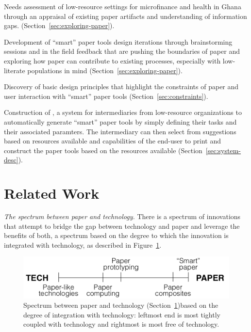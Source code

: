 \documentclass{sig-alternate}
\begin{document}
\begin{compactitem}

  \item Needs assessment of low-resource settings for microfinance and health in Ghana through an appraisal of existing paper artifacts and understanding of information gaps. (Section~\ref{sec:exploring-paper}).
  \item Development of ``smart'' paper tools design iterations through brainstorming sessions and in the field feedback that are pushing the boundaries of paper and exploring how paper can contribute to existing processes, especially with low-literate populations in mind (Section~\ref{sec:exploring-paper}).
  \item Discovery of basic design principles that highlight the constraints of paper and user interaction with ``smart'' paper tools (Section~\ref{sec:constraints}).
  \item Construction of \nifty, a system for intermediaries from low-resource organizations to automatically generate ``smart'' paper tools by simply defining their tasks and their associated paramters. The intermediary can then select from suggestions based on resources available and capabilities of the end-user to print and construct the paper tools based on the resources available (Section~\ref{sec:system-desc}). 

\end{compactitem}


\section{Related Work}
\label{sec:related}

\emph{The spectrum between paper and technology.} 
There is a spectrum of innovations that attempt to bridge the gap between technology and paper and leverage the benefits of both, a spectrum based on the degree to which the innovation is integrated with technology, as described in Figure~\ref{fig:spectrum}.

\begin{figure}
\centering
\includegraphics[width=\linewidth]{img/spectrum.png}
\caption{Spectrum between paper and technology (Section~\ref{sec:related})based on the degree of integration with technology: leftmost end is most tightly coupled with technology and rightmost is most free of technology.}
\label{fig:spectrum}
\end{figure}
\end{document}
